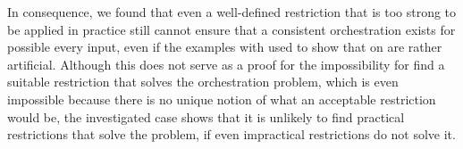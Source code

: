In consequence, we found that even a well-defined restriction that is too strong to be applied in practice still cannot ensure that a consistent orchestration exists for possible every input, even if the examples with used to show that on are rather artificial.
Although this does not serve as a proof for the impossibility for find a suitable restriction that solves the orchestration problem, which is even impossible because there is no unique notion of what an acceptable restriction would be, the investigated case shows that it is unlikely to find practical restrictions that solve the problem, if even impractical restrictions do not solve it.



